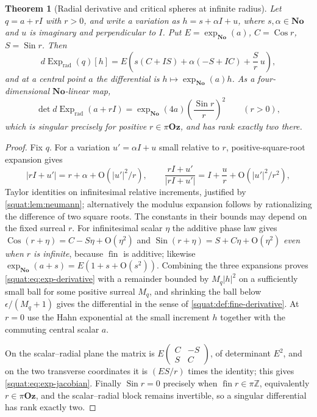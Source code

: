 \documentclass[11pt,letterpaper]{article}
\numberwithin{equation}{section}
\newtheorem{theorem}{Theorem}[section]
\theoremstyle{definition}
\theoremstyle{remark}
\newcommand{\No}{\mathbf{No}}
\newcommand{\Z}{\mathbb Z}
\newcommand{\Oz}{\mathbf{Oz}}
\newcommand{\fin}{\operatorname{fin}}
\newcommand{\Exp}{\operatorname{Exp}}
\newcommand{\Expr}{\Exp_{\mathrm{rad}}}
\newcommand{\Sin}{\operatorname{Sin}}
\newcommand{\Cos}{\operatorname{Cos}}
\newcommand{\abs}[1]{\left|#1\right|}
\begin{document}
\begin{theorem}[Radial derivative and critical spheres at infinite radius]
\label{squat:thm:exp-derivative}
Let $q=a+rI$ with $r>0$, and write a variation as $h=s+\alpha I+u$, where
$s,\alpha\in\No$ and $u$ is imaginary and perpendicular to $I$. Put
$E=\exp_{\No}(a)$, $C=\Cos r$, $S=\Sin r$. Then
\begin{equation}\label{squat:eq:exp-derivative}
 d\Expr(q)[h]=E\left(s(C+IS)+\alpha(-S+IC)+\frac{S}{r}\,u\right),
\end{equation}
and at a central point $a$ the differential is $h\mapsto\exp_{\No}(a)h$. As a
four-dimensional $\No$-linear map,
\begin{equation}\label{squat:eq:exp-jacobian}
 \det d\Expr(a+rI)=\exp_{\No}(4a)\left(\frac{\Sin r}{r}\right)^2\qquad(r>0),
\end{equation}
which is singular precisely for positive $r\in\pi\Oz$, and has rank exactly two there.
\end{theorem}
\begin{proof}
Fix $q$. For a variation $u'=\alpha I+u$ small relative to $r$, positive-square-root
expansion gives
\[
 \abs{rI+u'}=r+\alpha+\mathrm O(\abs{u'}^2/r),\qquad
 \frac{rI+u'}{\abs{rI+u'}}=I+\frac{u}{r}+\mathrm O(\abs{u'}^2/r^2),
\]
Taylor identities on infinitesimal relative increments, justified by
\cref{squat:lem:neumann}; alternatively the modulus expansion follows by rationalizing the
difference of two square roots. The constants in their bounds may depend on the fixed
surreal $r$. For infinitesimal scalar $\eta$ the additive phase law gives
$\Cos(r+\eta)=C-S\eta+\mathrm O(\eta^2)$ and $\Sin(r+\eta)=S+C\eta+\mathrm O(\eta^2)$
\emph{even when $r$ is infinite}, because $\fin$ is additive; likewise
$\exp_{\No}(a+s)=E(1+s+\mathrm O(s^2))$. Combining the three expansions proves
\cref{squat:eq:exp-derivative} with a remainder bounded by $M_q\abs h^2$ on a sufficiently
small ball for some positive surreal $M_q$, and shrinking the ball below
$\epsilon/(M_q+1)$ gives the differential in the sense of
\cref{squat:def:fine-derivative}. At $r=0$ use the Hahn exponential at the small increment
$h$ together with the commuting central scalar $a$.

On the scalar--radial plane the matrix is
$E\left(\begin{smallmatrix}C&-S\\S&C\end{smallmatrix}\right)$, of determinant $E^2$, and
on the two transverse coordinates it is $(ES/r)$ times the identity; this gives
\cref{squat:eq:exp-jacobian}. Finally $\Sin r=0$ precisely when $\fin r\in\pi\Z$,
equivalently $r\in\pi\Oz$, and the scalar--radial block remains invertible, so a singular
differential has rank exactly two.
\end{proof}
\end{document}
